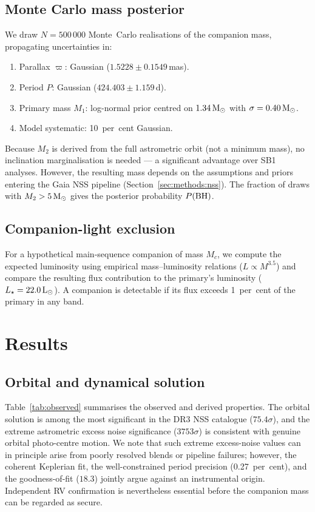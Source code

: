 \documentclass[usenatbib,fleqn]{mnras}
\newcommand{\Msun}{{\rm M}_\odot}
\newcommand{\Lsun}{{\rm L}_\odot}
\begin{document}
\subsection{Monte Carlo mass posterior}
\label{sec:methods:mc}

We draw $N = 500\,000$ Monte~Carlo realisations of the companion
mass, propagating uncertainties in:
\begin{enumerate}
\item Parallax $\varpi$: Gaussian ($1.5228 \pm 0.1549$\,mas).
\item Period $P$: Gaussian ($424.403 \pm 1.159$\,d).
\item Primary mass $M_1$: log-normal prior centred on
  $1.34\,\Msun$ with $\sigma = 0.40\,\Msun$.
\item Model systematic: 10~per~cent Gaussian.
\end{enumerate}
Because $M_2$ is derived from the full astrometric orbit (not a
minimum mass), no inclination marginalisation is needed --- a
significant advantage over SB1 analyses.  However, the
resulting mass depends on the assumptions and priors entering
the Gaia NSS pipeline (Section~\ref{sec:methods:nss}).  The
fraction of draws with $M_2 > 5\,\Msun$ gives the posterior
probability $P({\rm BH})$.

\subsection{Companion-light exclusion}
\label{sec:methods:companion}

For a hypothetical main-sequence companion of mass $M_c$, we
compute the expected luminosity using empirical mass--luminosity
relations ($L \propto M^{3.5}$) and compare the resulting flux
contribution to the primary's luminosity ($L_\star = 22.0\,\Lsun$).
A companion is detectable if its flux exceeds 1~per~cent of the
primary in any band.

\section{Results}
\label{sec:results}

\subsection{Orbital and dynamical solution}
\label{sec:results:orbit}

Table~\ref{tab:observed} summarises the observed and derived
properties.  The orbital solution is among the most significant
in the DR3 NSS catalogue ($75.4\sigma$), and the extreme
astrometric excess noise significance ($3753\sigma$) is consistent
with genuine orbital photo-centre motion.  We note that such
extreme excess-noise values can in principle arise from poorly
resolved blends or pipeline failures; however, the coherent
Keplerian fit, the well-constrained period precision
(0.27~per~cent), and the goodness-of-fit ($18.3$) jointly argue
against an instrumental origin.  Independent RV confirmation is
nevertheless essential before the companion mass can be regarded
as secure.
\end{document}
